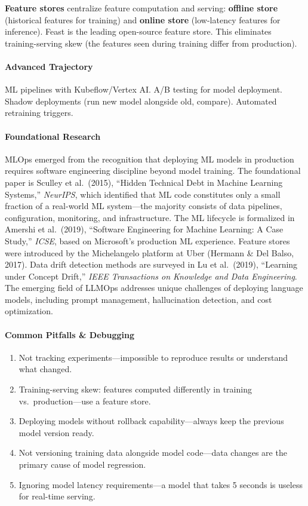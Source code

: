 \documentclass[11pt, a4paper, oneside]{report}
\begin{document}
\textbf{Feature stores} centralize feature computation and serving: \textbf{offline store} (historical features for training) and \textbf{online store} (low-latency features for inference). Feast is the leading open-source feature store. This eliminates training-serving skew (the features seen during training differ from production).

\paragraph{Advanced Trajectory} ML pipelines with Kubeflow/Vertex AI. A/B testing for model deployment. Shadow deployments (run new model alongside old, compare). Automated retraining triggers.


\paragraph{Foundational Research} MLOps emerged from the recognition that deploying ML models in production requires software engineering discipline beyond model training. The foundational paper is Sculley et al.\ (2015), ``Hidden Technical Debt in Machine Learning Systems,'' \emph{NeurIPS}, which identified that ML code constitutes only a small fraction of a real-world ML system---the majority consists of data pipelines, configuration, monitoring, and infrastructure. The ML lifecycle is formalized in Amershi et al.\ (2019), ``Software Engineering for Machine Learning: A Case Study,'' \emph{ICSE}, based on Microsoft's production ML experience. Feature stores were introduced by the Michelangelo platform at Uber (Hermann \& Del Balso, 2017). Data drift detection methods are surveyed in Lu et al.\ (2019), ``Learning under Concept Drift,'' \emph{IEEE Transactions on Knowledge and Data Engineering}. The emerging field of LLMOps addresses unique challenges of deploying language models, including prompt management, hallucination detection, and cost optimization.

\paragraph{Common Pitfalls \& Debugging}
\begin{enumerate}[leftmargin=*]
\item Not tracking experiments---impossible to reproduce results or understand what changed.
\item Training-serving skew: features computed differently in training vs.\ production---use a feature store.
\item Deploying models without rollback capability---always keep the previous model version ready.
\item Not versioning training data alongside model code---data changes are the primary cause of model regression.
\item Ignoring model latency requirements---a model that takes 5 seconds is useless for real-time serving.
\end{enumerate}
\end{document}
